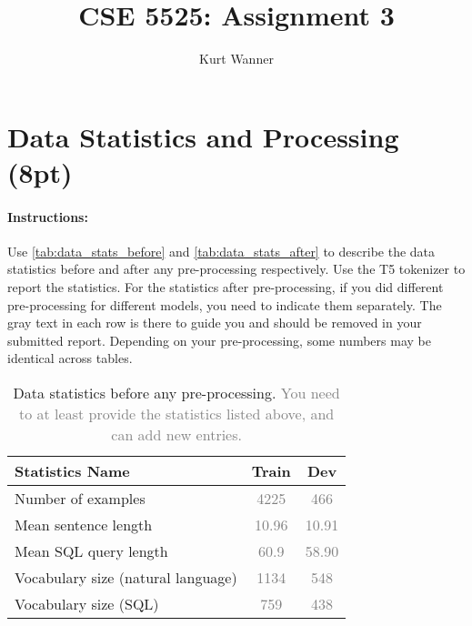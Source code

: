 \documentclass{article}
\title{CSE 5525: Assignment 3}
\author{Kurt Wanner}
\date{}
\begin{document}
\maketitle


\section{Data Statistics and Processing (8pt)}
\paragraph{Instructions:} Use \autoref{tab:data_stats_before} and \autoref{tab:data_stats_after} to describe the data statistics before and after any pre-processing respectively. 
Use the T5 tokenizer to report the statistics. 
For the statistics after pre-processing, if you did different pre-processing for different models, you need to indicate them separately.
The gray text in each row is there to guide you and should be removed in your submitted report.
Depending on your pre-processing, some numbers may be identical across tables. 

\begin{table}[h!]
\centering
\begin{tabular}{lcc}
\toprule
Statistics Name & Train & Dev \\
\midrule
Number of examples & \textcolor{gray}{4225} & \textcolor{gray}{466} \\
Mean sentence length & \textcolor{gray}{10.96}& \textcolor{gray}{10.91} \\
Mean SQL query length & \textcolor{gray}{60.9}& \textcolor{gray}{58.90}  \\
Vocabulary size (natural language)& \textcolor{gray}{1134}& \textcolor{gray}{548}  \\
Vocabulary size (SQL)& \textcolor{gray}{759}& \textcolor{gray}{438}  \\
\bottomrule
\end{tabular}
\caption{Data statistics before any pre-processing. \textcolor{gray}{You need to at least provide the statistics listed above, and can add new entries.}}
\label{tab:data_stats_before}
\end{table}
\end{document}
